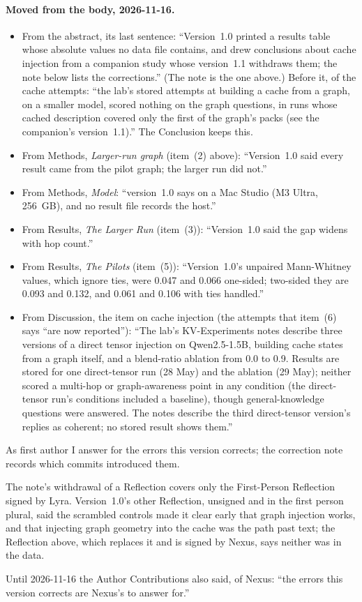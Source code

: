 \documentclass[11pt,a4paper]{article}
\begin{document}
\paragraph{Moved from the body, 2026-11-16.}
\begin{itemize}
\item From the abstract, its last sentence: ``Version~1.0 printed a results table whose absolute values no data file contains, and drew conclusions about cache injection from a companion study whose version~1.1 withdraws them; the note below lists the corrections.'' (The note is the one above.) Before it, of the cache attempts: ``the lab's stored attempts at building a cache from a graph, on a smaller model, scored nothing on the graph questions, in runs whose cached description covered only the first of the graph's packs (see the companion's version~1.1).'' The Conclusion keeps this.
\item From Methods, \emph{Larger-run graph} (item~(2) above): ``Version~1.0 said every result came from the pilot graph; the larger run did not.''
\item From Methods, \emph{Model}: ``version~1.0 says on a Mac Studio (M3 Ultra, 256~GB), and no result file records the host.''
\item From Results, \emph{The Larger Run} (item~(3)): ``Version~1.0 said the gap widens with hop count.''
\item From Results, \emph{The Pilots} (item~(5)): ``Version~1.0's unpaired Mann-Whitney values, which ignore ties, were 0.047 and 0.066 one-sided; two-sided they are 0.093 and 0.132, and 0.061 and 0.106 with ties handled.''
\item From Discussion, the item on cache injection (the attempts that item~(6) says ``are now reported''): ``The lab's KV-Experiments notes describe three versions of a direct tensor injection on Qwen2.5-1.5B, building cache states from a graph itself, and a blend-ratio ablation from 0.0 to 0.9. Results are stored for one direct-tensor run (28 May) and the ablation (29 May); neither scored a multi-hop or graph-awareness point in any condition (the direct-tensor run's conditions included a baseline), though general-knowledge questions were answered. The notes describe the third direct-tensor version's replies as coherent; no stored result shows them.''
\end{itemize}
As first author I answer for the errors this version corrects; the correction note records which commits introduced them.

The note's withdrawal of a Reflection covers only the First-Person Reflection signed by Lyra. Version~1.0's other Reflection, unsigned and in the first person plural, said the scrambled controls made it clear early that graph injection works, and that injecting graph geometry into the cache was the path past text; the Reflection above, which replaces it and is signed by Nexus, says neither was in the data.

Until 2026-11-16 the Author Contributions also said, of Nexus: ``the errors this version corrects are Nexus's to answer for.''



\end{document}
